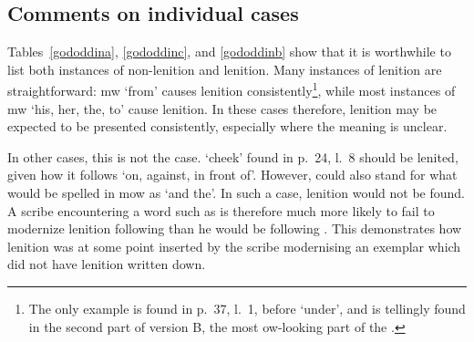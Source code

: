 \subsection{Comments on individual cases}


Tables~\ref{gododdina}, \ref{gododdinc}, and \ref{gododdinb} show that it is worthwhile to list both instances of non-lenition and lenition. Many instances of lenition are straightforward: \gls{mw}  `from' causes lenition consistently\footnote{The only example is found in p.~37, l.~1, before	 `under', and is tellingly found in the second part of version B, the most \gls{ow}-looking part of the .}, while most instances of \gls{mw}  `his, her, the, to' cause lenition. In these cases therefore, lenition may be expected to be presented consistently, especially where the meaning is unclear. 

In other cases, this is not the case.  `cheek' found in p.\ 24, l.\ 8 should be lenited, given how it follows  `on, against, in front of'. However,  could also stand for what would be spelled in \gls{mow} as  `and the'. In such a case, lenition would not be found. A scribe encountering a word such as  is therefore much more likely to fail to modernize lenition following than he would be following . This demonstrates how lenition was at some point inserted by the scribe modernising an exemplar which did not have lenition written down. 

